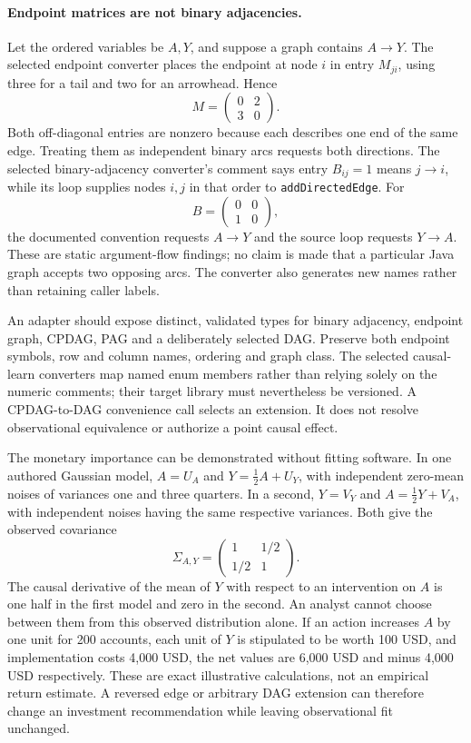 \paragraph{Endpoint matrices are not binary adjacencies.}
Let the ordered variables be $A,Y$, and suppose a graph contains $A\to Y$.
The selected endpoint converter places the endpoint at node $i$ in entry
$M_{ji}$, using three for a tail and two for an arrowhead. Hence
\[
 M=\begin{pmatrix}0&2\\3&0\end{pmatrix}.
\]
Both off-diagonal entries are nonzero because each describes one end of the
same edge. Treating them as independent binary arcs requests both directions.
The selected binary-adjacency converter's comment says entry $B_{ij}=1$
means $j\to i$, while its loop supplies nodes $i,j$ in that order to
\texttt{addDirectedEdge}. For
\[
 B=\begin{pmatrix}0&0\\1&0\end{pmatrix},
\]
the documented convention requests $A\to Y$ and the source loop requests
$Y\to A$. These are static argument-flow findings; no claim is made that a
particular Java graph accepts two opposing arcs. The converter also generates
new names rather than retaining caller labels.~\citep{exec24_pytetrad_source,exec24_pytetrad_choice}

An adapter should expose distinct, validated types for binary adjacency,
endpoint graph, CPDAG, PAG and a deliberately selected DAG. Preserve both
endpoint symbols, row and column names, ordering and graph class. The selected
causal-learn converters map named enum members rather than relying solely on
the numeric comments; their target library must nevertheless be versioned.
A CPDAG-to-DAG convenience call selects an extension. It does not resolve
observational equivalence or authorize a point causal effect.
\citep{exec24_pytetrad_source}

The monetary importance can be demonstrated without fitting software. In one
authored Gaussian model, $A=U_A$ and $Y=\tfrac12 A+U_Y$, with independent
zero-mean noises of variances one and three quarters. In a second, $Y=V_Y$
and $A=\tfrac12 Y+V_A$, with independent noises having the same respective
variances. Both give the observed covariance
\[
 \Sigma_{A,Y}=\begin{pmatrix}1&1/2\\1/2&1\end{pmatrix}.
\]
The causal derivative of the mean of $Y$ with respect to an intervention on
$A$ is one half in the first model and zero in the second. An analyst cannot
choose between them from this observed distribution alone. If an action
increases $A$ by one unit for 200 accounts, each unit of $Y$ is stipulated to
be worth 100 USD, and implementation costs 4,000 USD, the net values are
6,000 USD and minus 4,000 USD respectively. These are exact illustrative
calculations, not an empirical return estimate. A reversed edge or arbitrary
DAG extension can therefore change an investment recommendation while leaving
observational fit unchanged.~\citep{exec24_pytetrad_choice}

